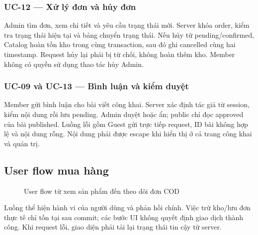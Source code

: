 \subsubsection{UC-12 — Xử lý đơn và hủy đơn}
Admin tìm đơn, xem chi tiết và yêu cầu trạng thái mới. Server khóa order, kiểm tra trạng thái hiện tại và bảng chuyển trạng thái. Nếu hủy từ pending/confirmed, Catalog hoàn tồn kho trong cùng transaction, sau đó ghi cancelled cùng hai timestamp. Request hủy lại phải bị từ chối, không hoàn thêm kho. Member không có quyền sử dụng thao tác hủy Admin.

\subsubsection{UC-09 và UC-13 — Bình luận và kiểm duyệt}
Member gửi bình luận cho bài viết công khai. Server xác định tác giả từ session, kiểm nội dung rồi lưu pending. Admin duyệt hoặc ẩn; public chỉ đọc approved của bài published. Luồng lỗi gồm Guest gửi trực tiếp request, ID bài không hợp lệ và nội dung rỗng. Nội dung phải được escape khi hiển thị ở cả trang công khai và quản trị.

\subsection{User flow mua hàng}
\begin{figure}[H]\centering
{}
\caption{User flow từ xem sản phẩm đến theo dõi đơn COD}\label{fig:user-flow}
\end{figure}
Luồng thể hiện hành vi của người dùng và phản hồi chính. Việc trừ kho/lưu đơn thực tế chỉ tồn tại sau commit; các bước UI không quyết định giao dịch thành công. Khi request lỗi, giao diện phải tải lại trạng thái tin cậy từ server.


